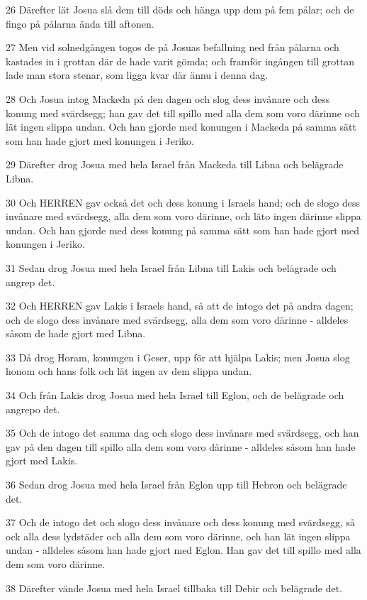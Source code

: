 \par 26 Därefter lät Josua slå dem till döds och hänga upp dem på fem pålar; och de fingo på pålarna ända till aftonen.
\par 27 Men vid solnedgången togos de på Josuas befallning ned från pålarna och kastades in i grottan där de hade varit gömda; och framför ingången till grottan lade man stora stenar, som ligga kvar där ännu i denna dag.
\par 28 Och Josua intog Mackeda på den dagen och slog dess invånare och dess konung med svärdsegg; han gav det till spillo med alla dem som voro därinne och lät ingen slippa undan. Och han gjorde med konungen i Mackeda på samma sätt som han hade gjort med konungen i Jeriko.
\par 29 Därefter drog Josua med hela Israel från Mackeda till Libna och belägrade Libna.
\par 30 Och HERREN gav också det och dess konung i Israels hand; och de slogo dess invånare med svärdsegg, alla dem som voro därinne, och läto ingen därinne slippa undan. Och han gjorde med dess konung på samma sätt som han hade gjort med konungen i Jeriko.
\par 31 Sedan drog Josua med hela Israel från Libna till Lakis och belägrade och angrep det.
\par 32 Och HERREN gav Lakis i Israels hand, så att de intogo det på andra dagen; och de slogo dess invånare med svärdsegg, alla dem som voro därinne - alldeles såsom de hade gjort med Libna.
\par 33 Då drog Horam, konungen i Geser, upp för att hjälpa Lakis; men Josua slog honom och hans folk och lät ingen av dem slippa undan.
\par 34 Och från Lakis drog Josua med hela Israel till Eglon, och de belägrade och angrepo det.
\par 35 Och de intogo det samma dag och slogo dess invånare med svärdsegg, och han gav på den dagen till spillo alla dem som voro därinne - alldeles såsom han hade gjort med Lakis.
\par 36 Sedan drog Josua med hela Israel från Eglon upp till Hebron och belägrade det.
\par 37 Och de intogo det och slogo dess invånare och dess konung med svärdsegg, så ock alla dess lydstäder och alla dem som voro därinne, och han lät ingen slippa undan - alldeles såsom han hade gjort med Eglon. Han gav det till spillo med alla dem som voro därinne.
\par 38 Därefter vände Josua med hela Israel tillbaka till Debir och belägrade det.
